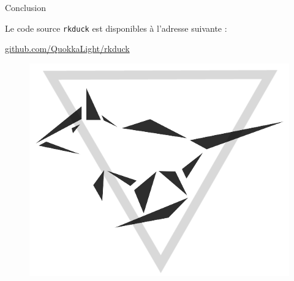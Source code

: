 \documentclass[10pt]{beamer}
\begin{document}
\begin{frame}{Conclusion}

  \begin{center}Le code source \texttt{rkduck} est disponibles à l'adresse suivante : \end{center}

  \begin{center}\url{github.com/QuokkaLight/rkduck}\end{center}
  
  \begin{figure}
	\begin{center}
	\includegraphics[scale=0.3]{logo_blk.png}
	\end{center}
  \end{figure}

\end{frame}


\end{document}
